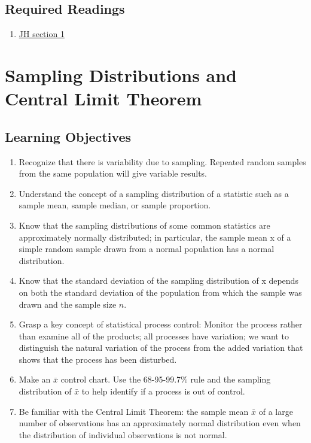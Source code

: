 \documentclass[letterpaper,12pt,twoside,]{pinp}
\providecommand{\tightlist}{%
  \setlength{\itemsep}{0pt}\setlength{\parskip}{0pt}}
\begin{document}
\hypertarget{required-readings}{%
\subsection{Required Readings}\label{required-readings}}

\begin{enumerate}
\def\labelenumi{\arabic{enumi}.}
\tightlist
\item
  \href{https://www.dropbox.com/s/kr293cablb11nrm/Ch13SamplingDistributionsJH2018.pdf?dl=0}{JH
  section 1}
\end{enumerate}

\vspace*{0.25cm}

\hypertarget{sampling-distributions-and-central-limit-theorem}{%
\section{Sampling Distributions and Central Limit
Theorem}\label{sampling-distributions-and-central-limit-theorem}}

\hypertarget{learning-objectives-1}{%
\subsection{Learning Objectives}\label{learning-objectives-1}}

\begin{enumerate}
\def\labelenumi{\arabic{enumi}.}
\tightlist
\item
  Recognize that there is variability due to sampling. Repeated random
  samples from the same population will give variable results.
\item
  Understand the concept of a sampling distribution of a statistic such
  as a sample mean, sample median, or sample proportion.
\item
  Know that the sampling distributions of some common statistics are
  approximately normally distributed; in particular, the sample mean x
  of a simple random sample drawn from a normal population has a normal
  distribution.
\item
  Know that the standard deviation of the sampling distribution of x
  depends on both the standard deviation of the population from which
  the sample was drawn and the sample size \(n\).
\item
  Grasp a key concept of statistical process control: Monitor the
  process rather than examine all of the products; all processes have
  variation; we want to distinguish the natural variation of the process
  from the added variation that shows that the process has been
  disturbed.
\item
  Make an \(\bar{x}\) control chart. Use the 68-95-99.7\% rule and the
  sampling distribution of \(\bar{x}\) to help identify if a process is
  out of control.
\item
  Be familiar with the Central Limit Theorem: the sample mean
  \(\bar{x}\) of a large number of observations has an approximately
  normal distribution even when the distribution of individual
  observations is not normal.
\end{enumerate}
\end{document}
